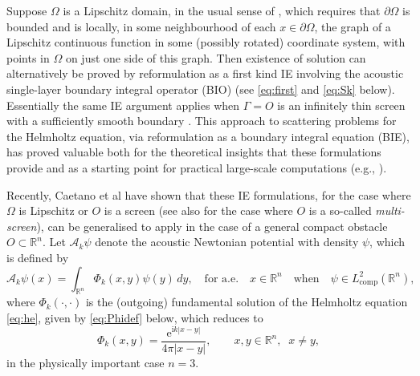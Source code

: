 \documentclass{birkjour}
\theoremstyle{definition}
\theoremstyle{remark}
\numberwithin{equation}{section}
\newcommand{\R}{\mathbb{R}}
\newcommand{\Hol}{H^{1,\mathrm{loc}}}
\newcommand{\Lcomp}{L^{2}_{\mathrm{comp}}}
\newcommand{\Hmc}{H^{-1}_{\mathrm{comp}}}
\newcommand{\ri}{\mathrm{i}}
\newcommand{\cA}{\mathcal{A}}
\newcommand{\re}{\mathrm{e}}
\begin{document}
Suppose $\Omega$ is a Lipschitz domain, in the usual sense of \cite[Defn.~3.28]{mclean2000strongly}, which requires that $\partial \Omega$  is bounded and is locally, in some neighbourhood of each $x\in \partial \Omega$, the graph of a Lipschitz continuous function in some (possibly rotated) coordinate system, with points in $\Omega$ on just one side of this graph. Then existence of solution can alternatively  be proved by reformulation as a first kind IE involving the   acoustic single-layer boundary integral operator (BIO) (see \eqref{eq:first} and \eqref{eq:Sk} below). Essentially the same IE argument applies when $\Gamma=O$ is an infinitely thin screen with a sufficiently smooth boundary \cite{Stephan1987}. This approach to scattering problems for the Helmholtz equation, via reformulation as a boundary integral equation (BIE), has proved valuable both for the theoretical insights that these formulations provide and as a starting point for practical large-scale computations (e.g., \cite{ColKre,BrKu01,chandler2012numerical,WoGeBeAr2015,ChDeCi2017,AmChLo2019,LiAtDe2024}).


Recently, Caetano et al \cite{caetano2025integral} have shown that these IE formulations, for the case where $\Omega$ is Lipschitz or $O$ is a screen (see also \cite{ClaeysHiptmair2013} for the case where $O$ is a so-called {\em multi-screen}), can be generalised to apply in the case of a general compact obstacle $O\subset \R^n$.
 Let $\cA_k\psi$ denote the acoustic Newtonian potential with density $\psi$, which is defined by 
\begin{equation} \label{eq:Newt}
\mathcal{A}_k\psi(x)=\int_{\mathbb{R}^n}\Phi_k(x,y)\psi(y)\,dy, \quad \mbox{for a.e.} \quad x\in \R^n \quad \mbox{when} \quad \psi\in \Lcomp(\R^n),
\end{equation}
where $\Phi_k(\cdot,\cdot)$ is the (outgoing) fundamental solution of the Helmholtz equation \eqref{eq:he}, given by \eqref{eq:Phidef} below, which reduces  to 
\begin{equation} \label{eq:Phidef2}
\Phi_k(x,y) = \frac{\re^{\ri k|x-y|}}{4\pi|x-y|},  \qquad x,y\in \R^n, \;\; x\neq y,
\end{equation}
in the physically important case $n=3$. %
\end{document}
